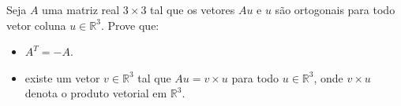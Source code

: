 Seja \(A\) uma matriz real \(3\times 3\) tal que os vetores \(Au\) e \(u\) são ortogonais para todo vetor coluna \(u\in \mathbb{R}^{3}\). Prove que:
\begin{itemize}

\item[(a)] \(A^{T}=-A\).

\item[(b)] existe um vetor \(v \in \mathbb{R}^{3}\) tal que \(Au=v\times u\) para todo \(u\in \mathbb{R}^{3}\), onde \(v \times u\) denota o produto vetorial em \(\mathbb{R}^{3}\).
\end{itemize}
